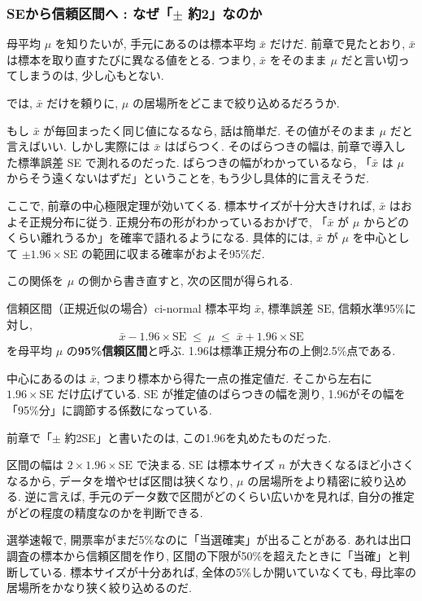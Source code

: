 \subsubsection{SEから信頼区間へ : なぜ「$\pm$ 約2」なのか}

母平均 $\mu$ を知りたいが, 手元にあるのは標本平均 $\bar{x}$ だけだ.
前章で見たとおり, $\bar{x}$ は標本を取り直すたびに異なる値をとる.
つまり, $\bar{x}$ をそのまま $\mu$ だと言い切ってしまうのは, 少し心もとない.

では, $\bar{x}$ だけを頼りに, $\mu$ の居場所をどこまで絞り込めるだろうか.

もし $\bar{x}$ が毎回まったく同じ値になるなら, 話は簡単だ.
その値がそのまま $\mu$ だと言えばいい.
しかし実際には $\bar{x}$ はばらつく.
そのばらつきの幅は, 前章で導入した標準誤差 SE で測れるのだった.
ばらつきの幅がわかっているなら, 「$\bar{x}$ は $\mu$ からそう遠くないはずだ」ということを, もう少し具体的に言えそうだ.

ここで, 前章の中心極限定理が効いてくる.
標本サイズが十分大きければ, $\bar{x}$ はおよそ正規分布に従う.
正規分布の形がわかっているおかげで, 「$\bar{x}$ が $\mu$ からどのくらい離れうるか」を確率で語れるようになる.
具体的には, $\bar{x}$ が $\mu$ を中心として $\pm 1.96 \times \mathrm{SE}$ の範囲に収まる確率がおよそ95\%だ.

この関係を $\mu$ の側から書き直すと, 次の区間が得られる.

\begin{defi}{信頼区間（正規近似の場合）}{ci-normal}
標本平均 $\bar{x}$, 標準誤差 $\mathrm{SE}$, 信頼水準95\%に対し,
\[
  \bar{x} - 1.96 \times \mathrm{SE} \;\leq\; \mu \;\leq\; \bar{x} + 1.96 \times \mathrm{SE}
\]
を母平均 $\mu$ の\textbf{95\%信頼区間}と呼ぶ.
1.96は標準正規分布の上側2.5\%点である.
\end{defi}

中心にあるのは $\bar{x}$, つまり標本から得た一点の推定値だ.
そこから左右に $1.96 \times \mathrm{SE}$ だけ広げている.
$\mathrm{SE}$ が推定値のばらつきの幅を測り, 1.96がその幅を「95\%分」に調節する係数になっている.

前章で「$\pm$ 約2SE」と書いたのは, この1.96を丸めたものだった.

区間の幅は $2 \times 1.96 \times \mathrm{SE}$ で決まる.
$\mathrm{SE}$ は標本サイズ $n$ が大きくなるほど小さくなるから, データを増やせば区間は狭くなり, $\mu$ の居場所をより精密に絞り込める.
逆に言えば, 手元のデータ数で区間がどのくらい広いかを見れば, 自分の推定がどの程度の精度なのかを判断できる.

選挙速報で, 開票率がまだ5\%なのに「当選確実」が出ることがある.
あれは出口調査の標本から信頼区間を作り, 区間の下限が50\%を超えたときに「当確」と判断している.
標本サイズが十分あれば, 全体の5\%しか開いていなくても, 母比率の居場所をかなり狭く絞り込めるのだ.

